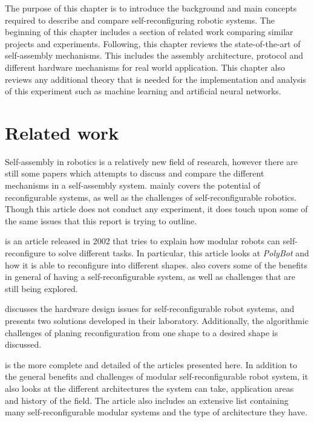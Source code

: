 The purpose of this chapter is to introduce the background and main concepts required to describe and compare self-reconfiguring robotic systems.
The beginning of this chapter includes a section of related work comparing similar projects and experiments.
Following, this chapter reviews the state-of-the-art of self-assembly mechanisms.
This includes the assembly architecture, protocol and different hardware mechanisms for real world application.
This chapter also reviews any additional theory that is needed for the implementation and analysis of this experiment such as machine learning and artificial neural networks.

\section{Related work}
Self-assembly in robotics is a relatively new field of research, however there are still some papers which attempts to discuss and compare the different mechanisms in a self-assembly system. 
\cite{murata_self-reconfigurable_2007} mainly covers the potential of reconfigurable systems, as well as the challenges of self-reconfigurable robotics. 
Though this article does not conduct any experiment, it does touch upon some of the same issues that this report is trying to outline.

\cite{yim_modular_2002} is an article released in 2002 that tries to explain how modular robots can self-reconfigure to solve different tasks. 
In particular, this article looks at \emph{PolyBot} and how it is able to reconfigure into different shapes. 
\cite{yim_modular_2002} also covers some of the benefits in general of having a self-reconfigurable system, as well as challenges that are still being explored.

\cite{rus_self-reconfiguring_2002} discusses the hardware design issues for self-reconfigurable robot systems, and presents two solutions developed in their laboratory.
Additionally, the algorithmic challenges of planing reconfiguration from one shape to a desired shape is discussed.

\cite{yim_modular_2007} is the more complete and detailed of the articles presented here. 
In addition to the general benefits and challenges of modular self-reconfigurable robot system, it also looks at the different architectures the system can take, application areas and history of the field.
The article also includes an extensive list containing many self-reconfigurable modular systems and the type of architecture they have.


